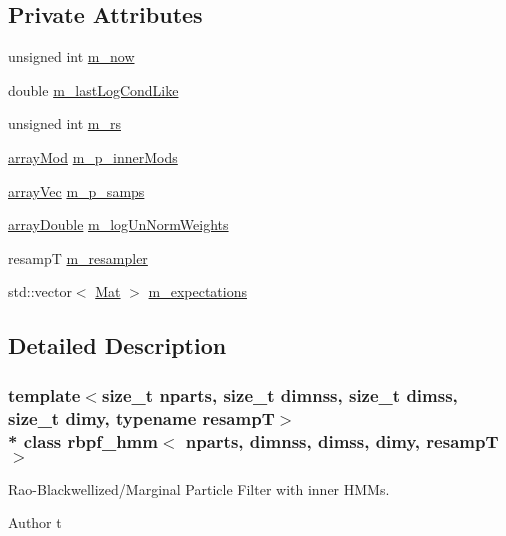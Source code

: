 \subsection*{Private Attributes}
\begin{DoxyCompactItemize}
\item 
unsigned int \hyperlink{classrbpf__hmm_a4efe6f063d6b2771c37ccb9a15ffa2c1}{m\+\_\+now}
\item 
double \hyperlink{classrbpf__hmm_aa0356c668abebeb05517aa15b641bd3c}{m\+\_\+last\+Log\+Cond\+Like}
\item 
unsigned int \hyperlink{classrbpf__hmm_a9f26da56457265fae51fdc56e8356f68}{m\+\_\+rs}
\item 
\hyperlink{classrbpf__hmm_a7a98fa51630fb04d09c3bd73e3e82ba8}{array\+Mod} \hyperlink{classrbpf__hmm_a8f6bb61b659415364e81c3286e92e180}{m\+\_\+p\+\_\+inner\+Mods}
\item 
\hyperlink{classrbpf__hmm_a9d9a1df8406fa41b2422291768d9c2f4}{array\+Vec} \hyperlink{classrbpf__hmm_ab64da08863b466fb14c0bcb2a2cbec70}{m\+\_\+p\+\_\+samps}
\item 
\hyperlink{classrbpf__hmm_a678ef06587101ea51bbb5709f08644bd}{array\+Double} \hyperlink{classrbpf__hmm_ad39632bbb88e1a1e8bb213343603fe6d}{m\+\_\+log\+Un\+Norm\+Weights}
\item 
resampT \hyperlink{classrbpf__hmm_af89d83ded78477186aab75c045112901}{m\+\_\+resampler}
\item 
std\+::vector$<$ \hyperlink{classrbpf__hmm_a5977cfebfd8736d3a54390f5a21d40b2}{Mat} $>$ \hyperlink{classrbpf__hmm_a659a1dcc02173d94e2c6f6f26639e1db}{m\+\_\+expectations}
\end{DoxyCompactItemize}


\subsection{Detailed Description}
\subsubsection*{template$<$size\+\_\+t nparts, size\+\_\+t dimnss, size\+\_\+t dimss, size\+\_\+t dimy, typename resampT$>$\\*
class rbpf\+\_\+hmm$<$ nparts, dimnss, dimss, dimy, resamp\+T $>$}

Rao-\/\+Blackwellized/\+Marginal Particle Filter with inner H\+M\+Ms. 

\begin{DoxyAuthor}{Author}
t 
\end{DoxyAuthor}


